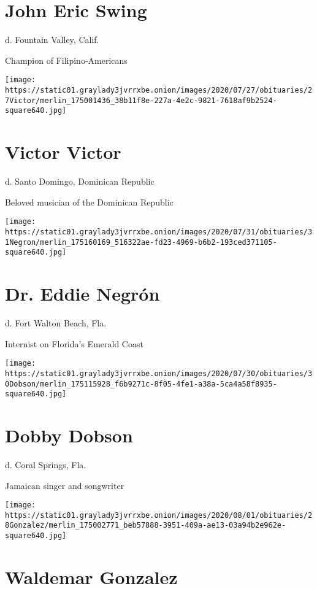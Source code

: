 \hypertarget{john-eric-swing}{%
\section{John Eric Swing}\label{john-eric-swing}}

d. Fountain Valley, Calif.

Champion of Filipino-Americans

\texttt{[image: https://static01.graylady3jvrrxbe.onion/images/2020/07/27/obituaries/27Victor/merlin\_175001436\_38b11f8e-227a-4e2c-9821-7618af9b2524-square640.jpg]}

\hypertarget{victor-victor}{%
\section{Victor Victor}\label{victor-victor}}

d. Santo Domingo, Dominican Republic

Beloved musician of the Dominican Republic

\texttt{[image: https://static01.graylady3jvrrxbe.onion/images/2020/07/31/obituaries/31Negron/merlin\_175160169\_516322ae-fd23-4969-b6b2-193ced371105-square640.jpg]}

\hypertarget{dr-eddie-negruxf3n}{%
\section{Dr. Eddie Negrón}\label{dr-eddie-negruxf3n}}

d. Fort Walton Beach, Fla.

Internist on Florida's Emerald Coast

\texttt{[image: https://static01.graylady3jvrrxbe.onion/images/2020/07/30/obituaries/30Dobson/merlin\_175115928\_f6b9271c-8f05-4fe1-a38a-5ca4a58f8935-square640.jpg]}

\hypertarget{dobby-dobson}{%
\section{Dobby Dobson}\label{dobby-dobson}}

d. Coral Springs, Fla.

Jamaican singer and songwriter

\texttt{[image: https://static01.graylady3jvrrxbe.onion/images/2020/08/01/obituaries/28Gonzalez/merlin\_175002771\_beb57888-3951-409a-ae13-03a94b2e962e-square640.jpg]}

\hypertarget{waldemar-gonzalez}{%
\section{Waldemar Gonzalez}\label{waldemar-gonzalez}}

